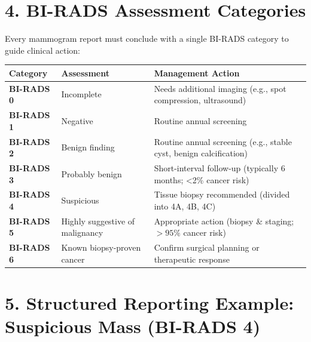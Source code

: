 \section*{4. BI-RADS Assessment Categories}
Every mammogram report must conclude with a single BI-RADS category to guide clinical action:

\begin{center}
\begin{longtable}{@{}p{}p{}p{}@{}}
\toprule
\textbf{Category} & \textbf{Assessment} & \textbf{Management Action} \\
\midrule
\textbf{BI-RADS 0} & Incomplete & Needs additional imaging (e.g., spot compression, ultrasound) \\
\textbf{BI-RADS 1} & Negative & Routine annual screening \\
\textbf{BI-RADS 2} & Benign finding & Routine annual screening (e.g., stable cyst, benign calcification) \\
\textbf{BI-RADS 3} & Probably benign & Short-interval follow-up (typically 6 months; <2\% cancer risk) \\
\textbf{BI-RADS 4} & Suspicious & Tissue biopsy recommended (divided into 4A, 4B, 4C) \\
\textbf{BI-RADS 5} & Highly suggestive of malignancy & Appropriate action (biopsy \& staging; $>95\%$ cancer risk) \\
\textbf{BI-RADS 6} & Known biopsy-proven cancer & Confirm surgical planning or therapeutic response \\
\bottomrule
\end{longtable}
\end{center}


\section*{5. Structured Reporting Example: Suspicious Mass (BI-RADS 4)}

